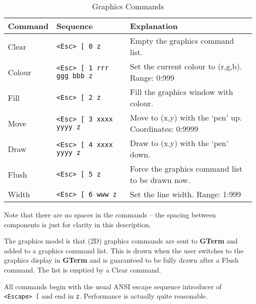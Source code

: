 \documentclass[a4paper,twoside,11pt]{article}
\newcommand{\newpara}{\par\vspace{4mm}\noindent}
\begin{document}
\begin{table}
\centering
\begin{tabular}{|| l | l | l ||}
\hline
Command & Sequence & Explanation\\
\hline
Clear  & \texttt{<Esc> [ 0 z}             & Empty the graphics command list.\\
Colour & \texttt{<Esc> [ 1 rrr ggg bbb z} & Set the current colour to (r,g,b). Range: 0:999\\
Fill   & \texttt{<Esc> [ 2 z}             & Fill the graphics window with colour.\\
Move   & \texttt{<Esc> [ 3 xxxx yyyy z}   & Move to (x,y) with the `pen' up. Coordinates: 0:9999\\
Draw   & \texttt{<Esc> [ 4 xxxx yyyy z}   & Draw to (x,y) with the `pen' down.\\
Flush  & \texttt{<Esc> [ 5 z}             & Force the graphics command list to be drawn now.\\
Width  & \texttt{<Esc> [ 6 www z}         & Set the line width. Range: 1:999\\
\hline
\end{tabular}
\caption{Graphics Commands}
\label{tab:graphicscmds}
\end{table}

\noindent
Note that there are no spaces in the commands -- the spacing between components is just for clarity
in this description.
\newpara
The graphics model is that (2D) graphics commands are sent to \textbf{GTerm} and added to a graphics
command list. This is drawn when the user switches to the graphics display in \textbf{GTerm} and is
guaranteed to be fully drawn after a Flush command. The list is emptied by a Clear command.
\newpara
All commands begin with the usual ANSI escape sequence introducer of \texttt{<Escape> [} and 
end in \texttt{z}. Performance is actually quite reasonable.
\end{document}
